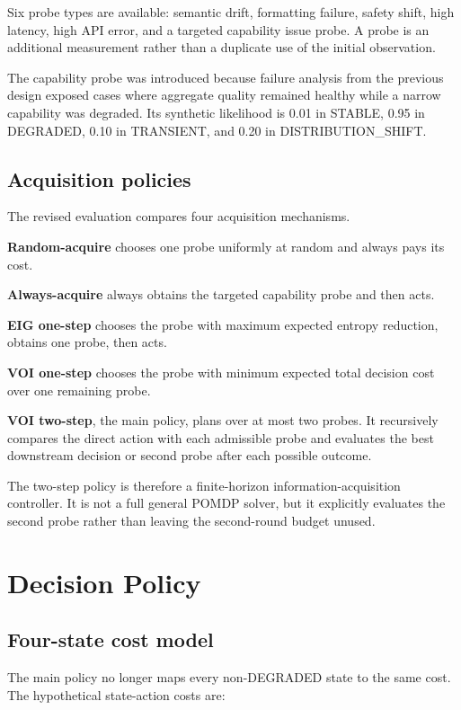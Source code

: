 \documentclass{article}
\begin{document}
Six probe types are available: semantic drift, formatting failure, safety shift, high latency, high API error, and a targeted capability issue probe. A probe is an additional measurement rather than a duplicate use of the initial observation.

The capability probe was introduced because failure analysis from the previous design exposed cases where aggregate quality remained healthy while a narrow capability was degraded. Its synthetic likelihood is 0.01 in STABLE, 0.95 in DEGRADED, 0.10 in TRANSIENT, and 0.20 in DISTRIBUTION\_SHIFT.

\subsection{Acquisition policies}

The revised evaluation compares four acquisition mechanisms.

\textbf{Random-acquire} chooses one probe uniformly at random and always pays its cost.

\textbf{Always-acquire} always obtains the targeted capability probe and then acts.

\textbf{EIG one-step} chooses the probe with maximum expected entropy reduction, obtains one probe, then acts.

\textbf{VOI one-step} chooses the probe with minimum expected total decision cost over one remaining probe.

\textbf{VOI two-step}, the main policy, plans over at most two probes. It recursively compares the direct action with each admissible probe and evaluates the best downstream decision or second probe after each possible outcome.

The two-step policy is therefore a finite-horizon information-acquisition controller. It is not a full general POMDP solver, but it explicitly evaluates the second probe rather than leaving the second-round budget unused.

\section{Decision Policy}

\subsection{Four-state cost model}

The main policy no longer maps every non-DEGRADED state to the same cost. The hypothetical state-action costs are:
\end{document}
